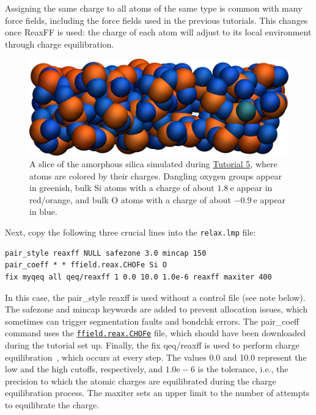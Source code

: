 \documentclass[9pt,tutorial]{livecoms}
\newcommand{\lmpcmd}[1]{\colorbox{listing}{\textcolor{command}{\small{#1}}}} %
\newcommand{\flecmd}[1]{\textcolor{command}{\texttt{#1}}} %
\newcommand{\dwlcmd}[1]{\textcolor{download}{\texttt{#1}}} %
\newcommand{\filepath}{https://raw.githubusercontent.com/lammpstutorials/lammpstutorials-article/main/files/}
\begin{document}
\begin{note}
  Assigning the same charge to all atoms of the same type is common with many
  force fields, including the force fields used in the previous tutorials.  This
  changes once ReaxFF is used: the charge of each atom will adjust to its local
  environment through charge equilibration.
\end{note}

\begin{figure}
\includegraphics[width=\linewidth]{SIO-slice}
\caption{A slice of the amorphous silica simulated during
\hyperref[reactive-silicon-dioxide-label]{Tutorial 5}, where atoms are colored by their charges.
Dangling oxygen groups appear in greenish, bulk Si atoms with a charge of about
$1.8~\text{e}$  appear in red/orange, and bulk O atoms with a charge of about
$-0.9~\text{e}$ appear in blue.}
\label{fig:SIO-slice}
\end{figure}

Next, copy the following three crucial lines into the \flecmd{relax.lmp} file:
\begin{lstlisting}
pair_style reaxff NULL safezone 3.0 mincap 150
pair_coeff * * ffield.reax.CHOFe Si O
fix myqeq all qeq/reaxff 1 0.0 10.0 1.0e-6 reaxff maxiter 400
\end{lstlisting}
In this case, the \lmpcmd{pair\_style reaxff} is used without a control file
(see note below).  The
\lmpcmd{safezone} and \lmpcmd{mincap} keywords are added to prevent
allocation issues, which sometimes can trigger segmentation faults and
\lmpcmd{bondchk} errors.  The \lmpcmd{pair\_coeff} command uses the
\href{\filepath tutorial5/ffield.reax.CHOFe}{\dwlcmd{ffield.reax.CHOFe}}
file, which should have been downloaded during the tutorial set up.  Finally, the
\lmpcmd{fix qeq/reaxff} is used to perform charge equilibration~\cite{rappe1991charge},
which occurs at every step.  The values 0.0 and 10.0 represent the
low and the high cutoffs, respectively, and $1.0 \text{e} -6$ is the
tolerance, i.e., the precision to which the atomic charges are
equilibrated during the charge equilibration process.
The \lmpcmd{maxiter} sets an upper limit to the number of attempts to
equilibrate the charge.
\end{document}
